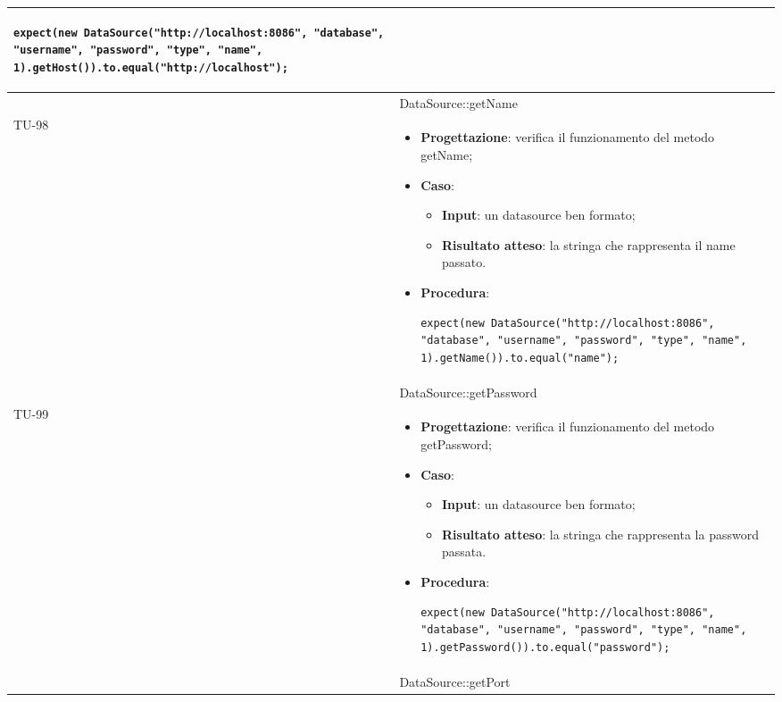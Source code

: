 \begin{longtable}{|C{1.5cm}|C{14.5cm}|}
\begin{itemize}
	\begin{lstlisting}
expect(new DataSource("http://localhost:8086", "database", "username", "password", "type", "name", 1).getHost()).to.equal("http://localhost");
	\end{lstlisting}
\end{itemize}\\
\hline
{} & DataSource::getName
\\ \hline
{TU-98} &
\begin{itemize}
	\item \textbf{Progettazione}: verifica il funzionamento del metodo getName;
	\item \textbf{Caso}: 
	\begin{itemize}
		\item \textbf{Input}: un datasource ben formato;
		\item \textbf{Risultato atteso}: la stringa che rappresenta il name passato.
	\end{itemize}
	\item \textbf{Procedura}:
	\begin{lstlisting}
expect(new DataSource("http://localhost:8086", "database", "username", "password", "type", "name", 1).getName()).to.equal("name");
	\end{lstlisting}
\end{itemize}\\
\hline
{} & DataSource::getPassword
\\ \hline
{TU-99} &
\begin{itemize}
	\item \textbf{Progettazione}: verifica il funzionamento del metodo getPassword;
	\item \textbf{Caso}: 
	\begin{itemize}
		\item \textbf{Input}: un datasource ben formato;
		\item \textbf{Risultato atteso}: la stringa che rappresenta la password passata.
	\end{itemize}
	\item \textbf{Procedura}:
	\begin{lstlisting}
expect(new DataSource("http://localhost:8086", "database", "username", "password", "type", "name", 1).getPassword()).to.equal("password");
	\end{lstlisting}
\end{itemize}\\
\hline
{} & DataSource::getPort

\end{longtable}
